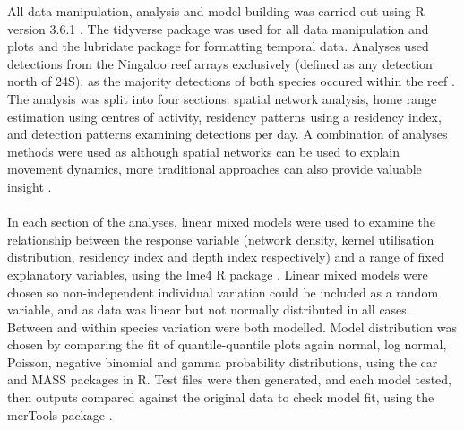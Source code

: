 \documentclass[11pt,a4paper]{article}
\begin{document}
	All data manipulation, analysis and model building was carried out using R version 3.6.1 \citep{RCoreTeam2015}. The tidyverse package \citep{Wickham2017} was used for all data manipulation and plots and the lubridate package \citep{Grolemund2011} for formatting temporal data. Analyses used detections from the Ningaloo reef arrays exclusively (defined as any detection north of 24\degree S), as the majority detections of both species occured within the reef \citep{Braccini2017}. The analysis was split into four sections: spatial network analysis, home range estimation using centres of activity, residency patterns using a residency index, and detection patterns examining detections per day. A combination of analyses methods were used as although spatial networks can be used to explain movement dynamics, more traditional approaches can also provide valuable insight \citep{Baeyaert2018}. \\
	\\
	In each section of the analyses, linear mixed models were used to examine the relationship between the response variable (network density, kernel utilisation distribution, residency index and depth index respectively) and a range of fixed explanatory variables, using the lme4 R package \citep{Bates2015}. Linear mixed models were chosen so non-independent individual variation could be included as a random variable, and as data was linear but not normally distributed in all cases. Between and within species variation were both modelled. Model distribution was chosen by comparing the fit of quantile-quantile plots again normal, log normal, Poisson, negative binomial and gamma probability distributions, using the car \citep{Fox2019} and MASS \citep{Venables2002} packages in R. Test files were then generated, and each model tested, then outputs compared against the original data to check model fit, using the merTools package \citep{Knowles2019}.\\
	\\
\end{document}
